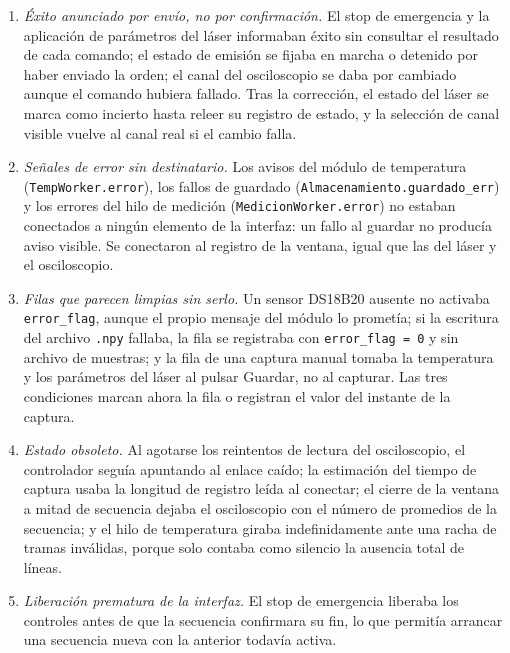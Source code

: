 \begin{enumerate}[leftmargin=*]
  \item \emph{Éxito anunciado por envío, no por confirmación.} El
    stop de emergencia y la aplicación de parámetros del láser
    informaban éxito sin consultar el resultado de cada comando; el
    estado de emisión se fijaba en marcha o detenido por haber enviado
    la orden; el canal del osciloscopio se daba por cambiado aunque el
    comando hubiera fallado. Tras la corrección, el estado del láser se
    marca como incierto hasta releer su registro de estado, y la
    selección de canal visible vuelve al canal real si el cambio
    falla.
  \item \emph{Señales de error sin destinatario.} Los avisos del
    módulo de temperatura (\texttt{TempWorker.\allowbreak error}), los fallos de
    guardado (\texttt{Almacenamiento.\allowbreak guardado\_err}) y los errores del
    hilo de medición (\texttt{MedicionWorker.\allowbreak error}) no estaban
    conectados a ningún elemento de la interfaz: un fallo al guardar
    no producía aviso visible. Se conectaron al registro de la
    ventana, igual que las del láser y el osciloscopio.
  \item \emph{Filas que parecen limpias sin serlo.} Un sensor
    DS18B20 ausente no activaba \texttt{error\_flag}, aunque el propio
    mensaje del módulo lo prometía; si la escritura del archivo
    \texttt{.npy} fallaba, la fila se registraba con
    \texttt{error\_flag = 0} y sin archivo de muestras; y la fila de
    una captura manual tomaba la temperatura y los parámetros del
    láser al pulsar Guardar, no al capturar. Las tres condiciones
    marcan ahora la fila o registran el valor del instante de la
    captura.
  \item \emph{Estado obsoleto.} Al agotarse los reintentos de lectura
    del osciloscopio, el controlador seguía apuntando al enlace caído;
    la estimación del tiempo de captura usaba la longitud de registro
    leída al conectar; el cierre de la ventana a mitad de secuencia
    dejaba el osciloscopio con el número de promedios de la secuencia;
    y el hilo de temperatura giraba indefinidamente ante una racha de
    tramas inválidas, porque solo contaba como silencio la ausencia
    total de líneas.
  \item \emph{Liberación prematura de la interfaz.} El stop de
    emergencia liberaba los controles antes de que la secuencia
    confirmara su fin, lo que permitía arrancar una secuencia nueva con
    la anterior todavía activa.
\end{enumerate}

